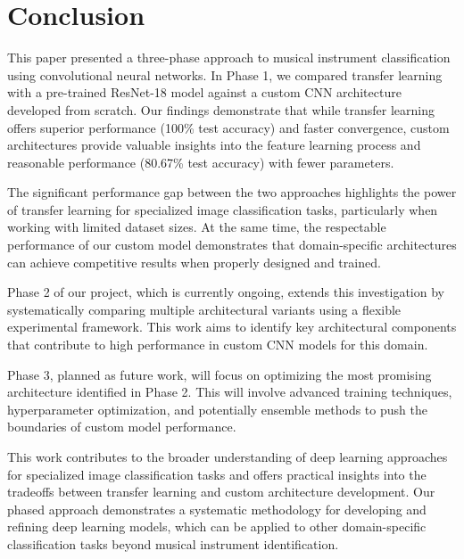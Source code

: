 \section{Conclusion}
This paper presented a three-phase approach to musical instrument classification using convolutional neural networks. In Phase 1, we compared transfer learning with a pre-trained ResNet-18 model against a custom CNN architecture developed from scratch. Our findings demonstrate that while transfer learning offers superior performance (100\% test accuracy) and faster convergence, custom architectures provide valuable insights into the feature learning process and reasonable performance (80.67\% test accuracy) with fewer parameters.

The significant performance gap between the two approaches highlights the power of transfer learning for specialized image classification tasks, particularly when working with limited dataset sizes. At the same time, the respectable performance of our custom model demonstrates that domain-specific architectures can achieve competitive results when properly designed and trained.

Phase 2 of our project, which is currently ongoing, extends this investigation by systematically comparing multiple architectural variants using a flexible experimental framework. This work aims to identify key architectural components that contribute to high performance in custom CNN models for this domain.

Phase 3, planned as future work, will focus on optimizing the most promising architecture identified in Phase 2. This will involve advanced training techniques, hyperparameter optimization, and potentially ensemble methods to push the boundaries of custom model performance.

This work contributes to the broader understanding of deep learning approaches for specialized image classification tasks and offers practical insights into the tradeoffs between transfer learning and custom architecture development. Our phased approach demonstrates a systematic methodology for developing and refining deep learning models, which can be applied to other domain-specific classification tasks beyond musical instrument identification.
